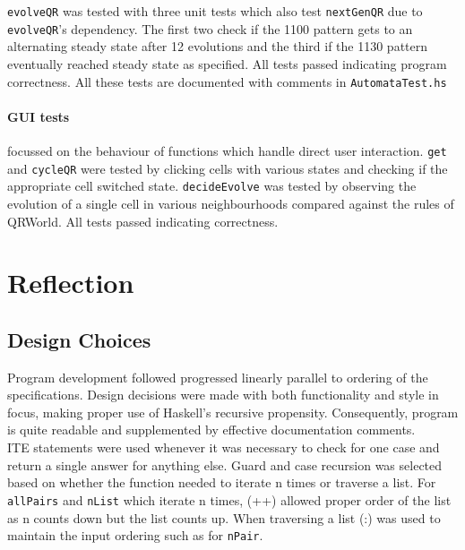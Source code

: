 \documentclass[11pt]{article}
\begin{document}
 \verb|evolveQR| was tested with three unit tests which also test \verb|nextGenQR| due to \verb|evolveQR|'s dependency. The first two check if the 1100 pattern gets to an alternating steady state after 12 evolutions and the third if the 1130 pattern eventually reached steady state as specified. All tests passed indicating program correctness. All these tests are documented with comments in \verb|AutomataTest.hs|
 
\paragraph{GUI tests} focussed on the behaviour of functions which handle direct user interaction. \verb|get| and \verb|cycleQR| were tested by clicking cells with various states and checking if the appropriate cell switched state. \verb|decideEvolve| was tested by observing the evolution of a single cell in various neighbourhoods compared against the rules of QRWorld. All tests passed indicating correctness.




\section{Reflection}
    \subsection{Design Choices}
   Program development followed progressed linearly parallel to ordering of the specifications.  Design decisions were made with both functionality and style in focus, making proper use of Haskell's recursive propensity. Consequently, program is quite readable and supplemented by effective documentation comments.\\
   
   ITE statements were used whenever it was necessary to check for one case and return a single answer for anything else. Guard and case recursion was selected based on whether the function needed to iterate n times or traverse a list. For \verb|allPairs| and \verb|nList| which iterate n times, (++) allowed proper order of the list as n counts down but the list counts up. When traversing a list (:) was used to maintain the input ordering such as for  \verb|nPair|. \\
   
\end{document}
